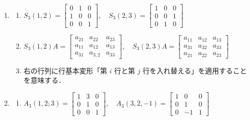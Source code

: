 \documentclass[11pt, uplatex, dvipdfmx]{jsarticle}
\begin{document}
\begin{enumerate}
\item
  \begin{enumerate}[(1)]
    \setlength{\itemsep}{1ex}
    
  \item $S_3(1,2)=\left[
      \begin{array}{rrr}
        0 & 1 & 0\\
        1 & 0 & 0\\
        0 & 0 & 1
      \end{array}
    \right], \quad S_3(2,3) = \left[
      \begin{array}{rrr}
        1 & 0 & 0\\
        0 & 0 & 1\\
        0 & 1 & 0
      \end{array}
    \right]$

  \item $S_3(1,2)A=\left[
      \begin{array}{rrr}
        a_{21} & a_{22} & a_{23}\\
        a_{11} & a_{12} & a_{13}\\
        a_{31} & a_{3,2} & a_{33}
      \end{array}
    \right], \quad S_3(2,3) A = \left[
      \begin{array}{rrr}
        a_{11} & a_{12} & a_{13}\\
        a_{31} & a_{32} & a_{33}\\
        a_{21} & a_{22} & a_{23}
      \end{array}
    \right]$

  \item 右の行列に行基本変形「第 $i$ 行と第 $j$ 行を入れ替える」を適用することを意味する．
  \end{enumerate}

\item
  \begin{enumerate}[(1)]
    \setlength{\itemsep}{1ex}
    
  \item $A_3(1,2;3)=\left[
      \begin{array}{rrr}
        1 & 3 & 0\\
        0 & 1 & 0\\
        0 & 0 & 1
      \end{array}
    \right], \quad A_3(3,2,-1)=\left[
      \begin{array}{rrr}
        1 & 0 & 0\\
        0 & 1 & 0\\
        0 & -1 & 1
      \end{array}
    \right]$
    

\end{enumerate}
\end{enumerate}
\end{document}
